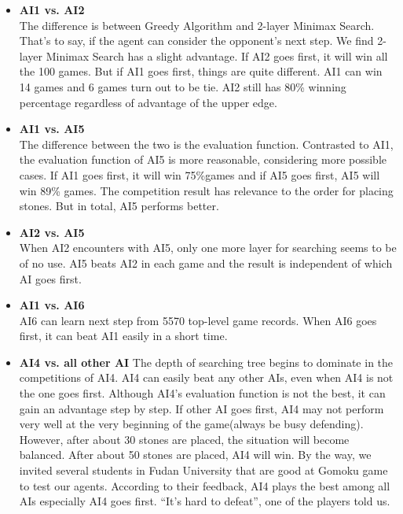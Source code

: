 \documentclass[12pt,a4paper]{article}
\begin{document}
\begin{itemize}
\item \textbf{AI1 vs. AI2}\\
The difference is between Greedy Algorithm and 2-layer Minimax Search. That's to say, if the agent can consider the opponent's next step. We find 2-layer Minimax Search has a slight advantage. If AI2 goes first, it will win all the 100 games. But if AI1 goes first, things are quite different. AI1 can win 14 games and 6 games turn out to be tie. AI2 still has 80\% winning percentage regardless of advantage of the upper edge.
\item \textbf{AI1 vs. AI5}\\
The difference between the two is the evaluation function. Contrasted to AI1, the evaluation function of AI5 is more reasonable, considering more possible cases. If AI1 goes first, it will win 75\%games and if AI5 goes first, AI5 will win 89\% games. The competition result has relevance to the order for placing stones. But in total, AI5 performs better.
\item \textbf{AI2 vs. AI5}\\
When AI2 encounters with AI5, only one more layer for searching seems to be of no use. AI5 beats AI2 in each game and the result is independent of which AI goes first.
\item \textbf{AI1 vs. AI6}\\
AI6 can learn next step from 5570 top-level game records. When AI6 goes first, it can beat AI1 easily in a short time.
\item \textbf{AI4 vs. all other AI}
The depth of searching tree begins to dominate in the competitions of AI4. AI4 can easily beat any other AIs, even when AI4 is not the one goes first. Although AI4's evaluation function is not the best, it can gain an advantage step by step. If other AI goes first, AI4 may not perform very well at the very beginning of the game(always be busy defending). However, after about 30 stones are placed, the situation will become balanced. After about 50 stones are placed, AI4 will win.
By the way, we invited several students in Fudan University that are good at Gomoku game to test our agents. According to their feedback, AI4 plays the best among all AIs especially AI4 goes first. ``It's hard to defeat'', one of the players told us.
\end{itemize}




\end{document}

